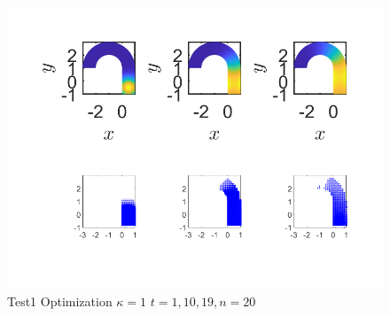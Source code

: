 \documentclass[11pt, a4paper]{article}
\theoremstyle{definition}
\begin{document}
    \begin{figure}[h]
    	\centering
    	\includegraphics[scale=0.7]{Test101Opt.png}
    	\caption{Test1 Optimization $\kappa = 1$ $t =1, 10, 19, n = 20$} 
    	\label{FTest11Opt}
    \end{figure}
    
\end{document}
